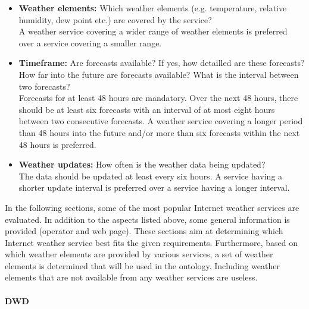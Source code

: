 \begin{itemize}
  \item \textbf{Weather elements:} Which weather elements (e.g. temperature, relative humidity, dew point etc.) are covered by the service?\\
  A weather service covering a wider range of weather elements is preferred over a service covering a smaller range.
  \item \textbf{Timeframe:} Are forecasts available? If yes, how detailled are these forecasts? How far into the future are forecasts available? What is the interval between two forecasts?\\
  Forecasts for at least 48 hours are mandatory. Over the next 48 hours, there should be at least six forecasts with an interval of at most eight hours between two consecutive forecasts. A weather service covering a longer period than 48 hours into the future and/or more than six forecasts within the next 48 hours is preferred.
  \item \textbf{Weather updates:} How often is the weather data being updated?\\
  The data should be updated at least every six hours. A service having a shorter update interval is preferred over a service having a longer interval.
\end{itemize}

In the following sections, some of the most popular Internet weather services are evaluated. In addition to the aspects listed above, some general information is provided (operator and web page). These sections aim at determining which Internet weather service best fits the given requirements. Furthermore, based on which weather elements are provided by various services, a set of weather elements is determined that will be used in the ontology. Including weather elements that are not available from any weather services are useless.


\paragraph{DWD}

